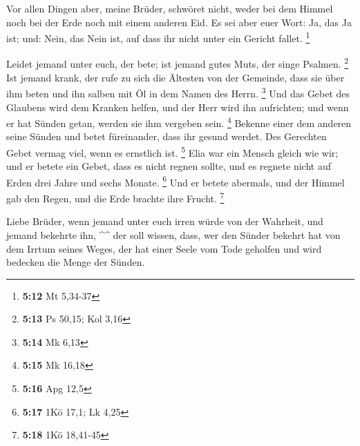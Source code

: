  Vor allen Dingen aber, meine Brüder, schwöret nicht,
weder bei dem Himmel noch bei der Erde noch mit einem anderen Eid. Es
sei aber euer Wort: Ja, das Ja ist; und: Nein, das Nein ist, auf dass
ihr nicht unter ein Gericht fallet. \footnote{\textbf{5:12} Mt 5,34-37}

 Leidet jemand unter euch, der bete; ist jemand gutes
Muts, der singe Psalmen. \footnote{\textbf{5:13} Ps 50,15; Kol 3,16}
 Ist jemand krank, der rufe zu sich die Ältesten von der
Gemeinde, dass sie über ihm beten und ihn salben mit Öl in dem Namen des
Herrn. \footnote{\textbf{5:14} Mk 6,13}  Und das Gebet
des Glaubens wird dem Kranken helfen, und der Herr wird ihn aufrichten;
und wenn er hat Sünden getan, werden sie ihm vergeben sein. \footnote{\textbf{5:15}
  Mk 16,18}  Bekenne einer dem anderen seine Sünden und
betet füreinander, dass ihr gesund werdet. Des Gerechten Gebet vermag
viel, wenn es ernstlich ist. \footnote{\textbf{5:16} Apg 12,5}
 Elia war ein Mensch gleich wie wir; und er betete ein
Gebet, dass es nicht regnen sollte, und es regnete nicht auf Erden drei
Jahre und sechs Monate. \footnote{\textbf{5:17} 1Kö 17,1; Lk 4,25}
 Und er betete abermals, und der Himmel gab den Regen,
und die Erde brachte ihre Frucht. \footnote{\textbf{5:18} 1Kö 18,41-45}

 Liebe Brüder, wenn jemand unter euch irren würde von der
Wahrheit, und jemand bekehrte ihn, \^{}\^{}  der soll
wissen, dass, wer den Sünder bekehrt hat von dem Irrtum seines Weges,
der hat einer Seele vom Tode geholfen und wird bedecken die Menge der
Sünden.
